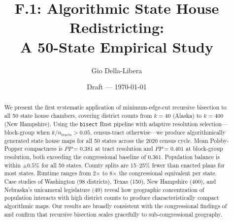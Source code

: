 \documentclass[12pt]{article}
\title{F.1: Algorithmic State House Redistricting:\\
       A 50-State Empirical Study}
\author{Gio Della-Libera}
\date{Draft --- \today}
\begin{document}
\maketitle

\begin{abstract}
We present the first systematic application of minimum-edge-cut recursive
bisection to all 50 state house chambers, covering district counts from
$k=40$ (Alaska) to $k=400$ (New Hampshire). Using the \texttt{bisect}
Rust pipeline with adaptive resolution selection---block-group when
$k/n_{\mathrm{tracts}} > 0.05$, census-tract otherwise---we produce
algorithmically generated state house maps for all 50 states across the
2020 census cycle. Mean Polsby-Popper compactness is $\overline{PP} = 0.381$
at tract resolution and $\overline{PP} = 0.401$ at block-group resolution,
both exceeding the congressional baseline of $0.361$.
Population balance is within $\pm 0.5\%$ for all 50 states.
County splits are 15--25\% fewer than enacted plans for most states.
Runtime ranges from 2$\times$ to 8$\times$ the congressional equivalent per state.
Case studies of Washington (98 districts), Texas (150), New Hampshire (400),
and Nebraska's unicameral legislature (49) reveal how geographic concentration
of population interacts with high district counts to produce characteristically
compact algorithmic maps. Our results are broadly consistent with the
congressional findings of \citet{dellaLibera2026mec} and confirm that
recursive bisection scales gracefully to sub-congressional geography.
\end{abstract}












\end{document}
